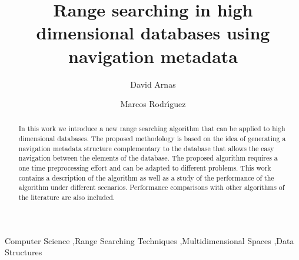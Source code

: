 \documentclass[preprint,12pt]{elsarticle}
\begin{document}
\begin{frontmatter}



\title{Range searching in high dimensional databases using navigation metadata}

\author[label]{David Arnas}
\author[label]{Marcos Rodr\'{\i}guez}
\address[label]{Centro Universitario de la Defensa de Zaragoza. IUMA.}


\begin{abstract}
In this work we introduce a new range searching algorithm that can be applied to high dimensional databases. The proposed methodology is based on the idea of generating a navigation metadata structure complementary to the database that allows the easy navigation between the elements of the database. The proposed algorithm requires a one time preprocessing effort and can be adapted to different problems. This work contains a description of the algorithm as well as a study of the performance of the algorithm under different scenarios. Performance comparisons with other algorithms of the literature are also included. 
\end{abstract}

\begin{keyword}
Computer Science \sep Range Searching Techniques \sep Multidimensional Spaces \sep Data Structures



\end{keyword}

\end{frontmatter}
\end{document}
